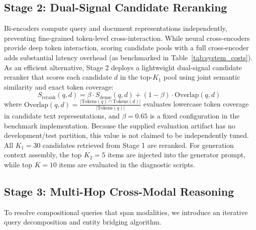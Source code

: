 \documentclass[conference]{IEEEtran}
\begin{document}
\subsection{Stage 2: Dual-Signal Candidate Reranking}
Bi-encoders compute query and document representations independently, preventing fine-grained token-level cross-interaction. While neural cross-encoders provide deep token interaction, scoring candidate pools with a full cross-encoder adds substantial latency overhead (as benchmarked in Table~\ref{tab:system_costs}). As an efficient alternative, Stage 2 deploys a lightweight dual-signal candidate reranker that scores each candidate $d$ in the top-$K_1$ pool using joint semantic similarity and exact token coverage:
\begin{equation}
    S_{\text{rerank}}(q, d) = \beta \cdot S_{\text{dense}}(q, d) + (1 - \beta) \cdot \text{Overlap}(q, d)
\end{equation}
where $\text{Overlap}(q, d) = \frac{|\text{Tokens}(q) \cap \text{Tokens}(d)|}{|\text{Tokens}(q)|}$ evaluates lowercase token coverage in candidate text representations, and $\beta = 0.65$ is a fixed configuration in the benchmark implementation. Because the supplied evaluation artifact has no development/test partition, this value is not claimed to be independently tuned. All $K_1 = 30$ candidates retrieved from Stage 1 are reranked. For generation context assembly, the top $K_2 = 5$ items are injected into the generator prompt, while top $K = 10$ items are evaluated in the diagnostic scripts.

\subsection{Stage 3: Multi-Hop Cross-Modal Reasoning}
To resolve compositional queries that span modalities, we introduce an iterative query decomposition and entity bridging algorithm.
\end{document}
